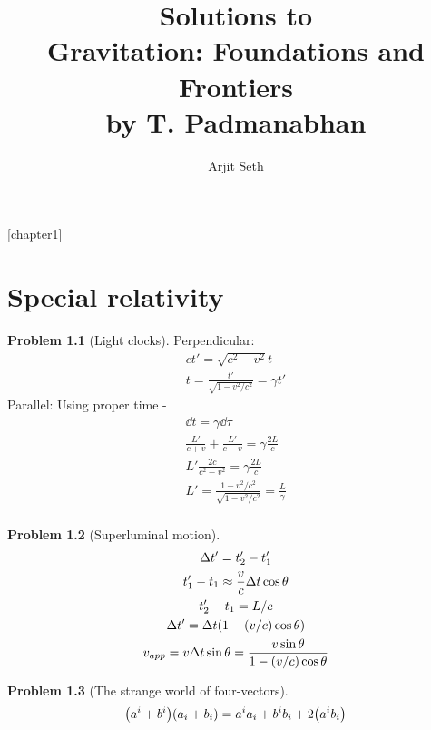 \documentclass{report}
\theoremstyle{definition}
\begin{document}
\title{Solutions to \\ Gravitation: Foundations and Frontiers \\ by T. Padmanabhan}

\author{Arjit Seth}
\date{}

\maketitle

\newtheorem{chapter1}{Problem}
[chapter1]

\chapter{Special relativity}

\begin{chapter1}[Light clocks]
	Perpendicular:
	\begin{gather*}
		ct' = \sqrt{c^2 - v^2}t \\
		t = \frac{t'}{\sqrt{1 - v^2/c^2}} = \gamma t'
	\end{gather*}
	Parallel: Using proper time -
	\begin{gather*}
		\dd{t} = \gamma\dd{\tau} \\ 
		\frac{L'}{c+v} + \frac{L'}{c-v} = \gamma\frac{2L}{c} \\
		L'\frac{2c}{c^2 - v^2}  = \gamma\frac{2L}{c} \\
		L' = \frac{1-v^2/c^2}{\sqrt{1-v^2/c^2}} = \frac{L}{\gamma} \\
	\end{gather*}
\end{chapter1}

\begin{chapter1}[Superluminal motion]
	\begin{gather*}
		\Delta t' = t_2' - t_1' \\
		t_1' - t_1 \approx \frac{v}{c}\Delta t \cos\theta \\
		t_2' - t_1 = L/c \\
		\Delta t' = \Delta t\pqty{1-(v/c)\cos\theta} \\
		v_{app} = v\Delta t \sin\theta = \frac{v\sin\theta}{1-(v/c)\cos\theta}
	\end{gather*}
\end{chapter1}

\begin{chapter1}[The strange world of four-vectors]
	\begin{gather*}
		\pqty{a^i + b^i}\pqty{a_i + b_i} = a^i a_i + b^i b_i + 2\pqty{a^i b_i}
	\end{gather*}

\end{chapter1}
\end{document}
